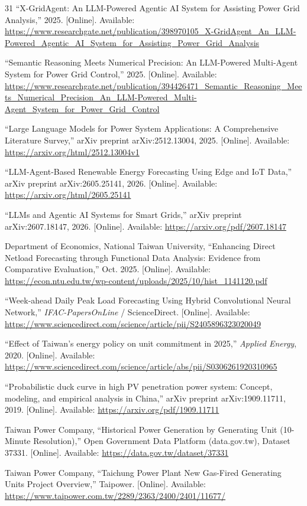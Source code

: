 \documentclass[conference]{IEEEtran}
\begin{document}
\begin{thebibliography}{31}
``X-GridAgent: An LLM-Powered Agentic AI System for Assisting Power Grid Analysis,'' 2025. [Online]. Available: \url{https://www.researchgate.net/publication/398970105_X-GridAgent_An_LLM-Powered_Agentic_AI_System_for_Assisting_Power_Grid_Analysis}

``Semantic Reasoning Meets Numerical Precision: An LLM-Powered Multi-Agent System for Power Grid Control,'' 2025. [Online]. Available: \url{https://www.researchgate.net/publication/394426471_Semantic_Reasoning_Meets_Numerical_Precision_An_LLM-Powered_Multi-Agent_System_for_Power_Grid_Control}

``Large Language Models for Power System Applications: A Comprehensive Literature Survey,'' arXiv preprint arXiv:2512.13004, 2025. [Online]. Available: \url{https://arxiv.org/html/2512.13004v1}

``LLM-Agent-Based Renewable Energy Forecasting Using Edge and IoT Data,'' arXiv preprint arXiv:2605.25141, 2026. [Online]. Available: \url{https://arxiv.org/html/2605.25141}

``LLMs and Agentic AI Systems for Smart Grids,'' arXiv preprint arXiv:2607.18147, 2026. [Online]. Available: \url{https://arxiv.org/pdf/2607.18147}

Department of Economics, National Taiwan University, ``Enhancing Direct Netload Forecasting through Functional Data Analysis: Evidence from Comparative Evaluation,'' Oct. 2025. [Online]. Available: \url{https://econ.ntu.edu.tw/wp-content/uploads/2025/10/hist_1141120.pdf}

``Week-ahead Daily Peak Load Forecasting Using Hybrid Convolutional Neural Network,'' \textit{IFAC-PapersOnLine} / ScienceDirect. [Online]. Available: \url{https://www.sciencedirect.com/science/article/pii/S2405896323020049}

``Effect of Taiwan's energy policy on unit commitment in 2025,'' \textit{Applied Energy}, 2020. [Online]. Available: \url{https://www.sciencedirect.com/science/article/abs/pii/S0306261920310965}

``Probabilistic duck curve in high PV penetration power system: Concept, modeling, and empirical analysis in China,'' arXiv preprint arXiv:1909.11711, 2019. [Online]. Available: \url{https://arxiv.org/pdf/1909.11711}

Taiwan Power Company, ``Historical Power Generation by Generating Unit (10-Minute Resolution),'' Open Government Data Platform (data.gov.tw), Dataset 37331. [Online]. Available: \url{https://data.gov.tw/dataset/37331}

Taiwan Power Company, ``Taichung Power Plant New Gas-Fired Generating Units Project Overview,'' Taipower. [Online]. Available: \url{https://www.taipower.com.tw/2289/2363/2400/2401/11677/}

\end{thebibliography}
\end{document}
